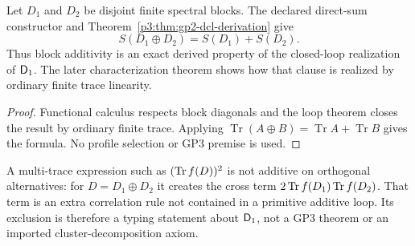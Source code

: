 \documentclass[12pt,a4paper]{article}
\begin{document}
\begin{lemma}
\label{p3:lem:additivity}
Let \(D_1\) and \(D_2\) be disjoint finite spectral blocks.  The declared
direct-sum constructor and Theorem~\ref{p3:thm:gp2-dcl-derivation} give
\[
        S(D_1\oplus D_2)=S(D_1)+S(D_2).
\]
Thus block additivity is an exact derived property of the closed-loop
realization of \(\mathsf{D}_1\).  The later
characterization theorem shows how that clause is realized by ordinary finite
trace linearity.
\end{lemma}

\begin{proof}
Functional calculus respects block diagonals and the loop theorem closes the
result by ordinary finite trace.  Applying
\(\operatorname{Tr}(A\oplus B)=\operatorname{Tr}A+\operatorname{Tr}B\)
gives the formula.  No profile selection or GP3 premise is used.
\end{proof}

\begin{remark}
A multi-trace expression such as $(\operatorname{Tr} f(D))^2$ is not additive on orthogonal
alternatives: for $D=D_1\oplus D_2$ it creates the cross term
$2\operatorname{Tr} f(D_1)\operatorname{Tr} f(D_2)$.  That term is an extra correlation rule not contained
in a primitive additive loop.  Its exclusion is therefore a typing statement
about \(\mathsf{D}_1\), not a GP3 theorem or an imported cluster-decomposition axiom.
\end{remark}
\end{document}
